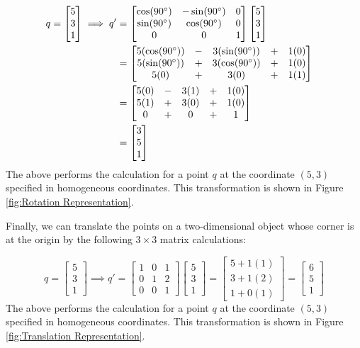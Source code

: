 \documentclass[
    12pt,
    twoside,
    bibstyle=chicago,
    headerstyle=uppercase,
	bibfile=biblatex_updating.bib
]{reedthesis}
\begin{document}
\begin{align*}	
	q = \begin{bmatrix}5\\3\\1\end{bmatrix} \implies q' &= 
	\begin{bmatrix}\cos(90\degree)&-\sin(90\degree)&0\\\sin(90\degree)&\cos(90\degree)&0\\0&0&1\end{bmatrix}
	\begin{bmatrix}5\\3\\1\end{bmatrix}\\ &= 
	\begin{bmatrix}5(\cos(90\degree)) &-& 3(\sin(90\degree)) &+& 1(0)\\5(\sin(90\degree)) &+& 3(\cos(90\degree)) &+& 1(0)\\5(0) &+& 3(0) &+& 1(1)\end{bmatrix}&\\ &=
	\begin{bmatrix}5(0) &-& 3(1) &+& 1(0)\\5(1) &+& 3(0) &+& 1(0)\\0 &+& 0 &+& 1\end{bmatrix}\\ &= \begin{bmatrix}3\\5\\1\end{bmatrix}
	\end{align*}
The above performs the calculation for a point $q$ at the coordinate $(5,3)$ specified in homogeneous coordinates. This transformation is shown in Figure \ref{fig:Rotation Representation}.

Finally, we can translate the points on a two-dimensional object whose corner is at the origin by the following $3\times3$ matrix calculations:

\[q = \begin{bmatrix}5\\3\\1\end{bmatrix} \implies q' = \begin{bmatrix}1&0&1\\0&1&2\\0&0&1\end{bmatrix}\begin{bmatrix}5\\3\\1\end{bmatrix} = \begin{bmatrix}5 + 1(1)\\3 + 1(2)\\1 + 0(1)\end{bmatrix}= \begin{bmatrix}6\\5\\1\end{bmatrix}\]
The above performs the calculation for a point $q$ at the coordinate $(5,3)$ specified in homogeneous coordinates. This transformation is shown in Figure \ref{fig:Translation Representation}.
\end{document}
